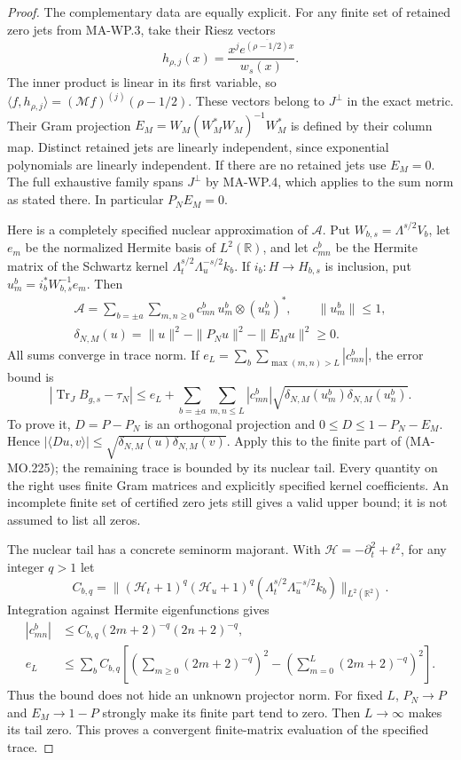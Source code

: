 \begin{proof}
The complementary data are equally explicit.  For any finite
set of retained zero jets from MA-WP.3, take their Riesz vectors
\[
 h_{\rho,j}(x)=\frac{x^j e^{\overline{(\rho-1/2)}x}}{w_s(x)}.
 \tag{MA-MO.224}
\]
The inner product is linear in its first variable, so
\(\langle f,h_{\rho,j}\rangle=(\mathcal Mf)^{(j)}(\rho-1/2)\).
These vectors belong to \(J^\perp\) in the exact metric.
Their Gram projection \(E_M=W_M(W_M^*W_M)^{-1}W_M^*\)
is defined by their column map.  Distinct retained jets are
linearly independent, since exponential polynomials are
linearly independent.  If there are no retained jets use
\(E_M=0\).  The full exhaustive family spans \(J^\perp\)
by MA-WP.4, which applies to the sum norm as stated there.
In particular \(P_NE_M=0\).

Here is a completely specified nuclear approximation of
\(\mathcal A\).  Put \(W_{b,s}=\Lambda^{s/2}V_b\), let
\(e_m\) be the normalized Hermite basis of \(L^2(\mathbb R)\),
and let \(c^b_{mn}\) be the Hermite matrix of the Schwartz
kernel \(\Lambda_t^{s/2}\Lambda_u^{-s/2}k_b\).
If \(i_b:H\to H_{b,s}\) is inclusion, put
\(u^b_m=i_b^*W_{b,s}^{-1}e_m\).  Then
\[
 \begin{gathered}
 \mathcal A=\sum_{b=\pm a}\sum_{m,n\ge0}
      c^b_{mn}\,u^b_m\otimes(u^b_n)^*,\qquad \|u^b_m\|\le1,\\
 \delta_{N,M}(u)=\|u\|^2-\|P_Nu\|^2-\|E_Mu\|^2\ge0 .
 \end{gathered}
 \tag{MA-MO.225}
\]
All sums converge in trace norm.  If
\(e_L=\sum_b\sum_{\max(m,n)>L}|c^b_{mn}|\), the error bound is
\[
 \left|\operatorname{Tr}_{J}B_{g,s}-\tau_N\right|
 \le e_L+
 \sum_{b=\pm a}\sum_{m,n\le L}|c^b_{mn}|
       \sqrt{\delta_{N,M}(u^b_m)\delta_{N,M}(u^b_n)} .
 \tag{MA-MO.226}
\]
To prove it, \(D=P-P_N\) is an orthogonal projection and
\(0\le D\le1-P_N-E_M\).  Hence
\( |\langle Du,v\rangle|
 \le\sqrt{\delta_{N,M}(u)\delta_{N,M}(v)}\).
Apply this to the finite part of (MA-MO.225); the remaining
trace is bounded by its nuclear tail.  Every quantity on
the right uses finite Gram matrices and explicitly specified
kernel coefficients.  An incomplete finite set of certified
zero jets still gives a valid upper bound; it is not assumed
to list all zeros.

The nuclear tail has a concrete seminorm majorant.  With
\(\mathcal H=-\partial_t^2+t^2\), for any integer \(q>1\)
let
\[
 C_{b,q}=\| (\mathcal H_t+1)^q(\mathcal H_u+1)^q
           (\Lambda_t^{s/2}\Lambda_u^{-s/2}k_b)\|_{L^2(\mathbb R^2)}.
\]
Integration against Hermite eigenfunctions gives
\[
 \begin{aligned}
 |c^b_{mn}|&\le C_{b,q}(2m+2)^{-q}(2n+2)^{-q},\\
 e_L&\le\sum_b C_{b,q}\left[
       \left(\sum_{m\ge0}(2m+2)^{-q}\right)^2
       -\left(\sum_{m=0}^L(2m+2)^{-q}\right)^2\right].
 \end{aligned}
 \tag{MA-MO.227}
\]
Thus the bound does not hide an unknown projector norm.
For fixed \(L\), \(P_N\to P\) and \(E_M\to1-P\) strongly
make its finite part tend to zero.  Then \(L\to\infty\)
makes its tail zero.  This proves a convergent finite-matrix
evaluation of the specified trace.
\end{proof}

